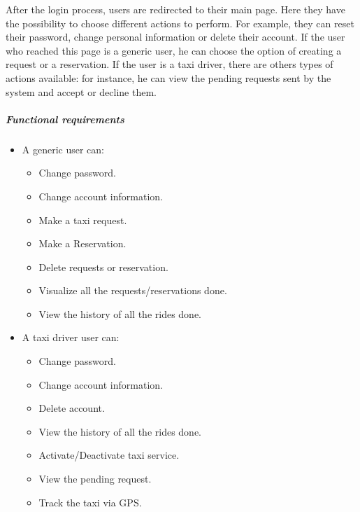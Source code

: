 After the login process, users are redirected to their main page. Here they have the possibility to choose different actions to perform.
For example, they can reset their password, change personal information or delete their account.
If the user who reached this page is a generic user, he can choose the option of creating a request or a reservation.
If the user is a taxi driver, there are others types of actions available: for instance, he can view the pending requests sent by the system and accept or decline them.

\subparagraph{Functional requirements}
\noindent
	\begin{itemize}
		\item A generic user can:
		\begin{itemize}
			\item Change password.
			\item Change account information.
			\item Make a taxi request.
			\item Make a Reservation.
			\item Delete requests or reservation.
			\item Visualize all the requests/reservations done.
			\item View the history of all the rides done.
		\end{itemize}
		\item A taxi driver user can:
		\begin{itemize}
			\item Change password.
			\item Change account information.
			\item Delete account.
			\item View the history of all the rides done.
			\item Activate/Deactivate taxi service.
			\item View the pending request.
			\item Track the taxi via GPS.
		\end{itemize}
		

\end{itemize}
